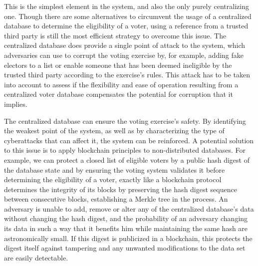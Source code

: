         This is the simplest element in the system, and also the only purely centralizing one. Though there are some alternatives to circumvent the usage of a centralized database to determine the eligibility of a voter, using a reference from a trusted third party is still the most efficient strategy to overcome this issue. The centralized database does provide a single point of attack to the system, which adversaries can use to corrupt the voting exercise by, for example, adding fake electors to a list or enable someone that has been deemed ineligible by the trusted third party according to the exercise's rules. This attack has to be taken into account to assess if the flexibility and ease of operation resulting from a centralized voter database compensates the potential for corruption that it implies.
        \par
        The centralized database can ensure the voting exercise's safety. By identifying the weakest point of the system, as well as by characterizing the type of cyberattacks that can affect it, the system can be reinforced. A potential solution to this issue is to apply blockchain principles to non-distributed databases. For example, we can protect a closed list of eligible voters by a public hash digest of the database state and by ensuring the voting system validates it before determining the eligibility of a voter, exactly like a blockchain protocol determines the integrity of its blocks by preserving the hash digest sequence between consecutive blocks, establishing a Merkle tree in the process. An adversary is unable to add, remove or alter any of the centralized database's data without changing the hash digest, and the probability of an adversary changing its data in such a way that it benefits him while maintaining the same hash are astronomically small. If this digest is publicized in a blockchain, this protects the digest itself against tampering and any unwanted modifications to the data set are easily detectable.
        \par


